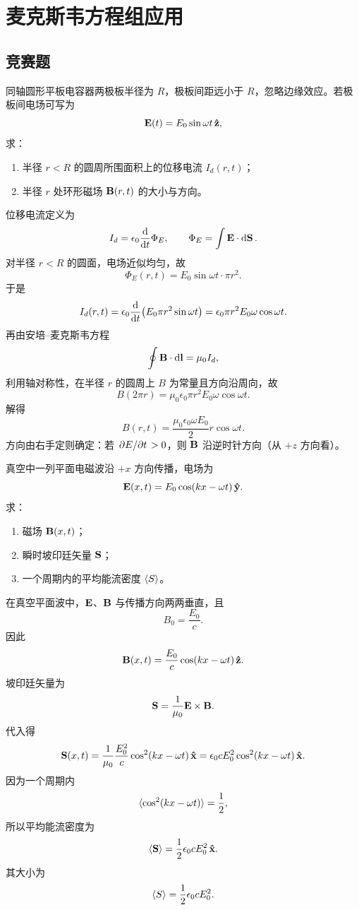 \chapter{麦克斯韦方程组应用}

\section{竞赛题}

\begin{competition}
同轴圆形平板电容器两极板半径为 $R$，极板间距远小于 $R$，忽略边缘效应。若极板间电场可写为
\[
\vb{E}(t)=E_0\sin \omega t\,\vu{z},
\]
求：
\begin{enumerate}
  \item 半径 $r<R$ 的圆周所围面积上的位移电流 $I_d(r,t)$；
  \item 半径 $r$ 处环形磁场 $\vb{B}(r,t)$ 的大小与方向。
\end{enumerate}
\begin{solution}
位移电流定义为
\[
I_d=\epsilon_0\dv{}{t}\Phi_E,
\qquad
\Phi_E=\int \vb{E}\cdot \dd{\vb{S}}.
\]
对半径 $r<R$ 的圆面，电场近似均匀，故
\[
\Phi_E(r,t)=E_0\sin \omega t\cdot \pi r^2.
\]
于是
\[
I_d(r,t)=\epsilon_0\dv{}{t}\qty(E_0\pi r^2\sin \omega t)
=\epsilon_0\pi r^2 E_0\omega \cos \omega t.
\]
再由安培--麦克斯韦方程
\[
\oint \vb{B}\cdot \dd{\vb{l}}=\mu_0 I_d,
\]
利用轴对称性，在半径 $r$ 的圆周上 $B$ 为常量且方向沿周向，故
\[
B(2\pi r)=\mu_0\epsilon_0\pi r^2 E_0\omega \cos \omega t.
\]
解得
\[
B(r,t)=\frac{\mu_0\epsilon_0\omega E_0}{2}r\cos \omega t.
\]
方向由右手定则确定：若 $\pdv*{E}{t}>0$，则 $\vb{B}$ 沿逆时针方向（从 $+z$ 方向看）。
\end{solution}
\end{competition}

\begin{competition}
真空中一列平面电磁波沿 $+x$ 方向传播，电场为
\[
\vb{E}(x,t)=E_0\cos(kx-\omega t)\,\vu{y}.
\]
求：
\begin{enumerate}
  \item 磁场 $\vb{B}(x,t)$；
  \item 瞬时坡印廷矢量 $\vb{S}$；
  \item 一个周期内的平均能流密度 $\langle S \rangle$。
\end{enumerate}
\begin{solution}
在真空平面波中，$\vb{E}$、$\vb{B}$ 与传播方向两两垂直，且
\[
B_0=\frac{E_0}{c}.
\]
因此
\[
\vb{B}(x,t)=\frac{E_0}{c}\cos(kx-\omega t)\,\vu{z}.
\]
坡印廷矢量为
\[
\vb{S}=\frac{1}{\mu_0}\vb{E}\times\vb{B}.
\]
代入得
\[
\vb{S}(x,t)=\frac{1}{\mu_0}\frac{E_0^2}{c}\cos^2(kx-\omega t)\,\vu{x}
=\epsilon_0 c E_0^2\cos^2(kx-\omega t)\,\vu{x}.
\]
因为一个周期内
\[
\langle \cos^2(kx-\omega t) \rangle=\frac{1}{2},
\]
所以平均能流密度为
\[
\langle \vb{S} \rangle=\frac{1}{2}\epsilon_0 c E_0^2\,\vu{x}.
\]
其大小为
\[
\langle S \rangle=\frac{1}{2}\epsilon_0 c E_0^2.
\]
\end{solution}
\end{competition}

